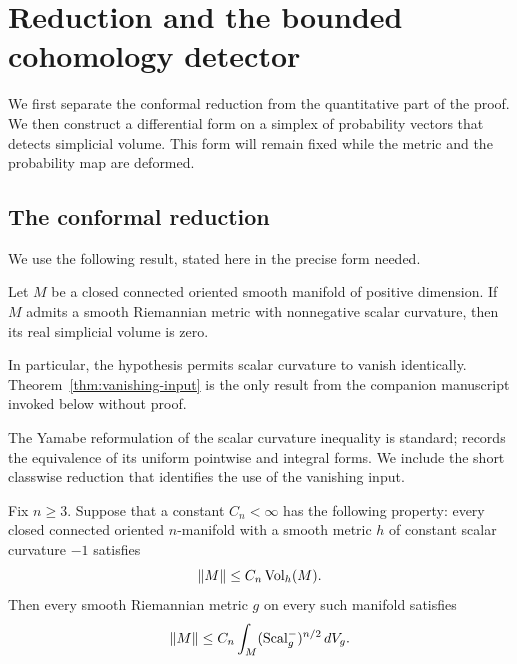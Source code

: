 \section{Reduction and the bounded cohomology detector}
\label{sec:reduction-detector}

We first separate the conformal reduction from the quantitative part of
the proof. We then construct a differential form on a simplex of
probability vectors that detects simplicial volume. This form will remain fixed while
the metric and the probability map are deformed.

\subsection{The conformal reduction}

We use the following result, stated here in the precise form needed.

\begin{theorem}
\label{thm:vanishing-input}
Let \(M\) be a closed connected oriented smooth manifold of positive
dimension. If \(M\) admits a smooth Riemannian metric with nonnegative
scalar curvature, then its real simplicial volume is zero.
\end{theorem}

In particular, the hypothesis permits scalar curvature to vanish
identically. Theorem~\ref{thm:vanishing-input} is the only result from
the companion manuscript invoked below without proof.

The Yamabe reformulation of the scalar curvature inequality is
standard; \cite[Lemma 2.1]{MinZhengZhu2026} records the equivalence of
its uniform pointwise and integral forms. We include the short
classwise reduction that identifies the use of the vanishing input.

\begin{proposition}
\label{prop:yamabe-reduction}
Fix \(n\ge3\). Suppose that a constant \(C_n<\infty\) has the following
property: every closed connected oriented \(n\)-manifold with a smooth
metric \(h\) of constant scalar curvature \(-1\) satisfies
\begin{equation}
  \|M\|\le C_n\operatorname{Vol}_h(M).
  \label{eq:scalar-minus-one-target}
\end{equation}
Then every smooth Riemannian metric \(g\) on every such manifold
satisfies
\begin{equation}
  \|M\|\le C_n\int_M(\operatorname{Scal}_g^-)^{n/2}\,dV_g .
  \label{eq:yamabe-transfer}
\end{equation}
\end{proposition}

